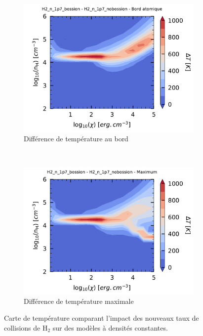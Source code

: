 \begin{figure}[!h]
    \centering
    \begin{subfigure}[t]{0.49\textwidth} %
        \centering \includegraphics[trim = {0 0 0 1cm },clip,width=1\textwidth]{figure/H2/diffgrid_bossionglover/mapTba_H2_n_1p7_bossion_H2_n_1p7_nobossion.pdf}
        \caption{Différence de température au bord}
        \label{fig:H2:Bossion:Tba}
    \end{subfigure}
    ~ 
    \begin{subfigure}[t]{0.49\textwidth}
        \centering \includegraphics[trim = {0 0 0 1cm },clip,width=1\textwidth]{figure/H2/diffgrid_bossionglover/mapTmax_H2_n_1p7_bossion_H2_n_1p7_nobossion.pdf}
        \caption{Différence de température maximale}
         \label{fig:H2:Bossion:Tmax}
    \end{subfigure}
    \caption{Carte de température comparant l'impact des nouveaux taux de collisions de $\mathrm{H}_2$ sur des modèles à densités constantes.}
\end{figure}


